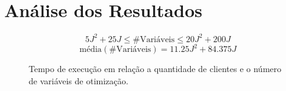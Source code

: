 \section{Análise dos Resultados}



    \[
        5 J^2 + 25 J \leq \text{\# Variáveis} \leq 20 J^2 + 200 J
    \]
    \[
        \text{média}\left(\text{\# Variáveis}\right) = 11.25 J^2 + 84.375 J
    \]

    \begin{figure}[H]
        \centering
        \caption{Tempo de execução em relação a quantidade de clientes e o número de variáveis de otimização.}

    \end{figure}
